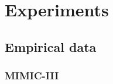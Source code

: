 \documentclass[
]{article}
\begin{document}
\hypertarget{experiments}{%
\section{Experiments}\label{experiments}}

\label{sec:experiments}

\hypertarget{empirical-data}{%
\subsection{Empirical data}\label{empirical-data}}

\label{sec:data}

\hypertarget{mimic-iii}{%
\subsubsection{MIMIC-III}\label{mimic-iii}}
\end{document}
